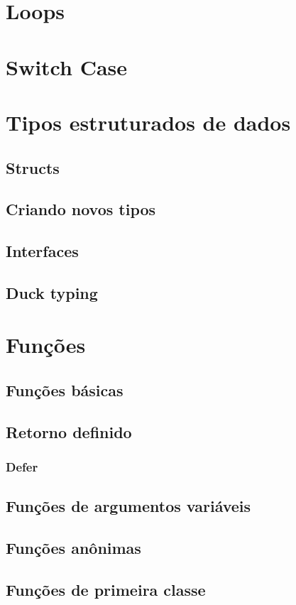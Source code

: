 \documentclass{SBCbookchapter}
\begin{document}
\section{Loops}

\section{Switch Case}

\section{Tipos estruturados de dados}
\subsection{Structs}
\subsection{Criando novos tipos}
\subsection{Interfaces}
\subsection{Duck typing}

\section{Funções}
\subsection{Funções básicas}
\subsection{Retorno definido}
\subsubsection{Defer}
\subsection{Funções de argumentos variáveis}
\subsection{Funções anônimas}
\subsection{Funções de primeira classe}
\end{document}
